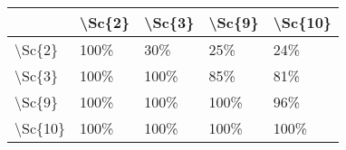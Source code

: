 \begin{tabular}{lllll}
\toprule
{} & \textbackslash Sc\{2\} & \textbackslash Sc\{3\} & \textbackslash Sc\{9\} & \textbackslash Sc\{10\} \\
\midrule
\textbackslash Sc\{2\}  &   100\% &    30\% &    25\% &     24\% \\
\textbackslash Sc\{3\}  &   100\% &   100\% &    85\% &     81\% \\
\textbackslash Sc\{9\}  &   100\% &   100\% &   100\% &     96\% \\
\textbackslash Sc\{10\} &   100\% &   100\% &   100\% &    100\% \\
\bottomrule
\end{tabular}
